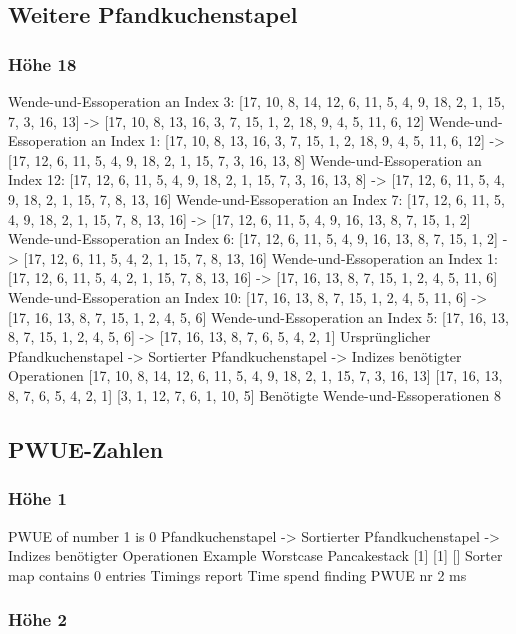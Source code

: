 {    \subsection{Weitere Pfandkuchenstapel}\label{sec:weitere-pfandkuchenstapel}
    \subsubsection{Höhe 18}

    Wende-und-Essoperation an Index 3: [17, 10, 8, 14, 12, 6, 11, 5, 4, 9, 18, 2, 1, 15, 7, 3, 16, 13] -> [17, 10, 8, 13, 16, 3, 7, 15, 1, 2, 18, 9, 4, 5, 11, 6, 12]
    Wende-und-Essoperation an Index 1: [17, 10, 8, 13, 16, 3, 7, 15, 1, 2, 18, 9, 4, 5, 11, 6, 12] -> [17, 12, 6, 11, 5, 4, 9, 18, 2, 1, 15, 7, 3, 16, 13, 8]
    Wende-und-Essoperation an Index 12: [17, 12, 6, 11, 5, 4, 9, 18, 2, 1, 15, 7, 3, 16, 13, 8] -> [17, 12, 6, 11, 5, 4, 9, 18, 2, 1, 15, 7, 8, 13, 16]
    Wende-und-Essoperation an Index 7: [17, 12, 6, 11, 5, 4, 9, 18, 2, 1, 15, 7, 8, 13, 16] -> [17, 12, 6, 11, 5, 4, 9, 16, 13, 8, 7, 15, 1, 2]
    Wende-und-Essoperation an Index 6: [17, 12, 6, 11, 5, 4, 9, 16, 13, 8, 7, 15, 1, 2] -> [17, 12, 6, 11, 5, 4, 2, 1, 15, 7, 8, 13, 16]
    Wende-und-Essoperation an Index 1: [17, 12, 6, 11, 5, 4, 2, 1, 15, 7, 8, 13, 16] -> [17, 16, 13, 8, 7, 15, 1, 2, 4, 5, 11, 6]
    Wende-und-Essoperation an Index 10: [17, 16, 13, 8, 7, 15, 1, 2, 4, 5, 11, 6] -> [17, 16, 13, 8, 7, 15, 1, 2, 4, 5, 6]
    Wende-und-Essoperation an Index 5: [17, 16, 13, 8, 7, 15, 1, 2, 4, 5, 6] -> [17, 16, 13, 8, 7, 6, 5, 4, 2, 1]
    Ursprünglicher Pfandkuchenstapel -> Sortierter Pfandkuchenstapel -> Indizes benötigter Operationen
    [17, 10, 8, 14, 12, 6, 11, 5, 4, 9, 18, 2, 1, 15, 7, 3, 16, 13]
    [17, 16, 13, 8, 7, 6, 5, 4, 2, 1]
    [3, 1, 12, 7, 6, 1, 10, 5]
    Benötigte Wende-und-Essoperationen 8
    \subsection{PWUE-Zahlen}\label{sec:pwue-zahlen}
    \subsubsection{Höhe 1}

    PWUE of number 1 is 0
    Pfandkuchenstapel -> Sortierter Pfandkuchenstapel -> Indizes benötigter Operationen
Example Worstcase Pancakestack
    [1]
    [1]
    []
    Sorter map contains 0 entries
    Timings report
    Time spend finding PWUE nr 2 ms
    \subsubsection{Höhe 2}

}
